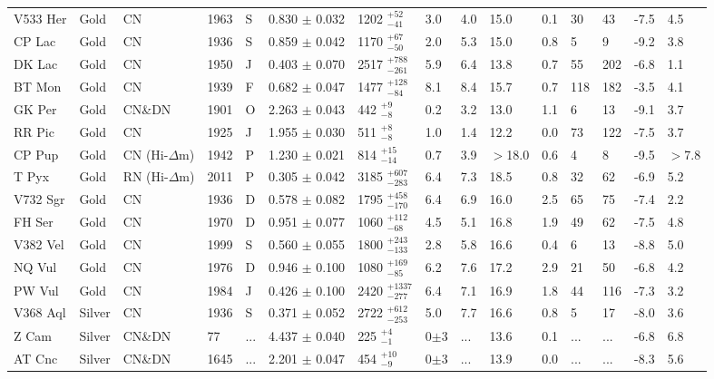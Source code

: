 \documentclass[a4paper,fleqn,usenatbib]{mnras}
\begin{document}
\begin{table*}
\begin{tabular}{lllllllllllllll}
V533 Her	&	Gold	&	CN	&	1963	&	S	&	0.830	$\pm$	0.032	&	1202	$_{-	41	}^{+	52	}$ &	3.0	&	4.0	&	15.0	&	0.1	&	30	&	43	&	-7.5	&	4.5	\\
CP Lac	&	Gold	&	CN	&	1936	&	S	&	0.859	$\pm$	0.042	&	1170	$_{-	50	}^{+	67	}$ &	2.0	&	5.3	&	15.0	&	0.8	&	5	&	9	&	-9.2	&	3.8	\\
DK Lac	&	Gold	&	CN	&	1950	&	J	&	0.403	$\pm$	0.070	&	2517	$_{-	261	}^{+	788	}$ &	5.9	&	6.4	&	13.8	&	0.7	&	55	&	202	&	-6.8	&	1.1	\\
BT Mon	&	Gold	&	CN	&	1939	&	F	&	0.682	$\pm$	0.047	&	1477	$_{-	84	}^{+	128	}$ &	8.1	&	8.4	&	15.7	&	0.7	&	118	&	182	&	-3.5	&	4.1	\\
GK Per	&	Gold	&	CN\&DN	&	1901	&	O	&	2.263	$\pm$	0.043	&	442	$_{-	8	}^{+	9	}$ &	0.2	&	3.2	&	13.0	&	1.1	&	6	&	13	&	-9.1	&	3.7	\\
RR Pic	&	Gold	&	CN	&	1925	&	J	&	1.955	$\pm$	0.030	&	511	$_{-	8	}^{+	8	}$ &	1.0	&	1.4	&	12.2	&	0.0	&	73	&	122	&	-7.5	&	3.7	\\
CP Pup	&	Gold	&	CN (Hi-$\Delta$m)	&	1942	&	P	&	1.230	$\pm$	0.021	&	814	$_{-	14	}^{+	15	}$ &	0.7	&	3.9	&	$>$18.0	&	0.6	&	4	&	8	&	-9.5	&	$>$7.8	\\
T Pyx	&	Gold	&	RN (Hi-$\Delta$m)	&	2011	&	P	&	0.305	$\pm$	0.042	&	3185	$_{-	283	}^{+	607	}$ &	6.4	&	7.3	&	18.5	&	0.8	&	32	&	62	&	-6.9	&	5.2	\\
V732 Sgr	&	Gold	&	CN	&	1936	&	D	&	0.578	$\pm$	0.082	&	1795	$_{-	170	}^{+	458	}$ &	6.4	&	6.9	&	16.0	&	2.5	&	65	&	75	&	-7.4	&	2.2	\\
FH Ser	&	Gold	&	CN	&	1970	&	D	&	0.951	$\pm$	0.077	&	1060	$_{-	68	}^{+	112	}$ &	4.5	&	5.1	&	16.8	&	1.9	&	49	&	62	&	-7.5	&	4.8	\\
V382 Vel	&	Gold	&	CN	&	1999	&	S	&	0.560	$\pm$	0.055	&	1800	$_{-	133	}^{+	243	}$ &	2.8	&	5.8	&	16.6	&	0.4	&	6	&	13	&	-8.8	&	5.0	\\
NQ Vul	&	Gold	&	CN	&	1976	&	D	&	0.946	$\pm$	0.100	&	1080	$_{-	85	}^{+	169	}$ &	6.2	&	7.6	&	17.2	&	2.9	&	21	&	50	&	-6.8	&	4.2	\\
PW Vul	&	Gold	&	CN	&	1984	&	J	&	0.426	$\pm$	0.100	&	2420	$_{-	277	}^{+	1337	}$ &	6.4	&	7.1	&	16.9	&	1.8	&	44	&	116	&	-7.3	&	3.2	\\
V368 Aql	&	Silver	&	CN	&	1936	&	S	&	0.371	$\pm$	0.052	&	2722	$_{-	253	}^{+	612	}$ &	5.0	&	7.7	&	16.6	&	0.8	&	5	&	17	&	-8.0	&	3.6	\\
Z Cam	&	Silver	&	CN\&DN	&	77	&	...	&	4.437	$\pm$	0.040	&	225	$_{-	1	}^{+	4	}$ &	0$\pm$3	&	...	&	13.6	&	0.1	&	...	&	...	&	-6.8	&	6.8	\\
AT Cnc	&	Silver	&	CN\&DN	&	1645	&	...	&	2.201	$\pm$	0.047	&	454	$_{-	9	}^{+	10	}$ &	0$\pm$3	&	...	&	13.9	&	0.0	&	...	&	...	&	-8.3	&	5.6	\\

\end{tabular}
\end{table*}
\end{document}
